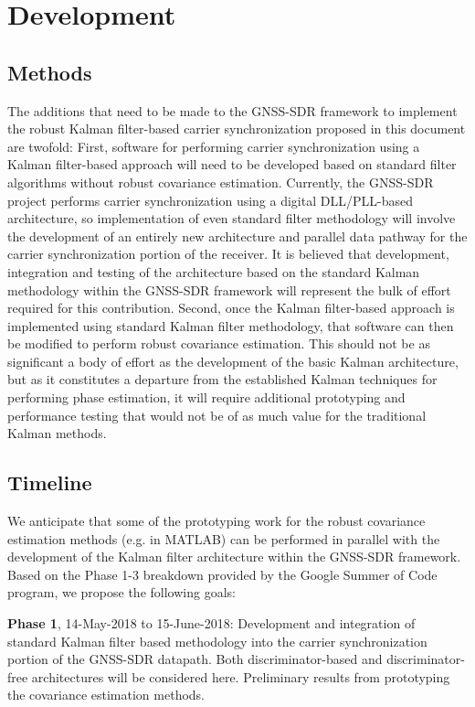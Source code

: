 \section{Development}
\subsection{Methods}

The additions that need to be made to the GNSS-SDR framework to implement the robust Kalman filter-based carrier synchronization proposed in this document are twofold: First, software for performing carrier synchronization using a Kalman filter-based approach will need to be developed based on standard filter algorithms without robust covariance estimation. Currently, the GNSS-SDR project performs carrier synchronization using a digital DLL/PLL-based architecture, so implementation of even standard filter methodology will involve the development of an entirely new architecture and parallel data pathway for the carrier synchronization portion of the receiver. It is believed that development, integration and testing of the architecture based on the standard Kalman methodology within the GNSS-SDR framework will represent the bulk of effort required for this contribution. Second, once the Kalman filter-based approach is implemented using standard Kalman filter methodology, that software can then be modified to perform robust covariance estimation. This should not be as significant a body of effort as the development of the basic Kalman architecture, but as it constitutes a departure from the established Kalman techniques for performing phase estimation, it will require additional prototyping and performance testing that would not be of as much value for the traditional Kalman methods.

\subsection{Timeline}

We anticipate that some of the prototyping work for the robust covariance estimation methods (e.g. in MATLAB) can be performed in parallel with the development of the Kalman filter architecture within the GNSS-SDR framework. Based on the Phase 1-3 breakdown provided by the Google Summer of Code program, we propose the following goals:

\textbf{Phase 1}, 14-May-2018 to 15-June-2018: Development and integration of standard Kalman filter based methodology into the carrier synchronization portion of the GNSS-SDR datapath. Both discriminator-based and discriminator-free architectures will be considered here. Preliminary results from prototyping the covariance estimation methods.

